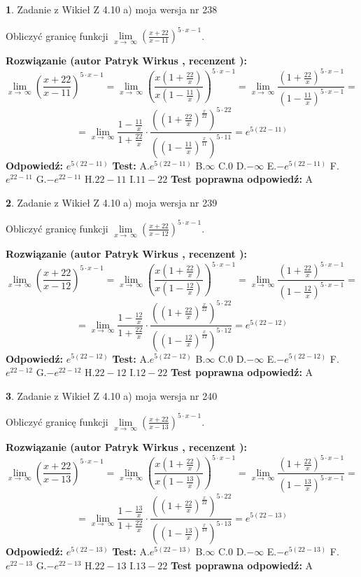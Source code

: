 \documentclass[12pt, a4paper]{article}
\theoremstyle{definition} %
\newtheorem{zad}{}
\newcommand{\zadStart}[1]{\begin{zad}#1\newline}
\newcommand{\zadStop}{\end{zad}}
\newcommand{\rozwStart}[2]{\noindent \textbf{Rozwiązanie (autor #1 , recenzent #2): }\newline}
\newcommand{\rozwStop}{\newline}
\newcommand{\odpStart}{\noindent \textbf{Odpowiedź:}\newline}
\newcommand{\odpStop}{\newline}
\newcommand{\testStart}{\noindent \textbf{Test:}\newline}
\newcommand{\testStop}{\newline}
\newcommand{\kluczStart}{\noindent \textbf{Test poprawna odpowiedź:}\newline}
\newcommand{\kluczStop}{\newline}
\begin{document}
\zadStart{Zadanie z Wikieł Z 4.10 a) moja wersja nr 238}


Obliczyć granicę funkcji  $\lim\limits_{x\to\ \infty}(\frac{x+22}{x-11})^{5\cdot x-1}$.
\zadStop
\rozwStart{Patryk Wirkus}{}
$$\lim\limits_{x\to\ \infty}(\frac{x+22}{x-11})^{5\cdot x-1} = \lim\limits_{x\to\ \infty}(\frac{x(1+\frac{22}{x})}{x(1-\frac{11}{x})})^{5\cdot x-1}=\lim\limits_{x\to\ \infty}\frac{(1+\frac{22}{x})^{5\cdot x-1}}{(1-\frac{11}{x})^{5\cdot x-1}}=$$
$$=\lim\limits_{x\to\ \infty}\frac{1-\frac{11}{x}}{1+\frac{22}{x}}\cdot\frac{((1+\frac{22}{x})^{\frac{x}{22}})^{5\cdot22}}{((1-\frac{11}{x})^{\frac{x}{11}})^{5\cdot11}}=e^{5(22-11)}$$
\rozwStop
\odpStart
$e^{5(22-11)}$
\odpStop
\testStart
A.$e^{5(22-11)}$ B.$\infty$ C.$0$ D.$-\infty$ E.$-e^{5(22-11)}$
F.$e^{22-11}$ G.$-e^{22-11}$
H.$22-11$
I.$11-22$
\testStop
\kluczStart
A
\kluczStop



\zadStart{Zadanie z Wikieł Z 4.10 a) moja wersja nr 239}


Obliczyć granicę funkcji  $\lim\limits_{x\to\ \infty}(\frac{x+22}{x-12})^{5\cdot x-1}$.
\zadStop
\rozwStart{Patryk Wirkus}{}
$$\lim\limits_{x\to\ \infty}(\frac{x+22}{x-12})^{5\cdot x-1} = \lim\limits_{x\to\ \infty}(\frac{x(1+\frac{22}{x})}{x(1-\frac{12}{x})})^{5\cdot x-1}=\lim\limits_{x\to\ \infty}\frac{(1+\frac{22}{x})^{5\cdot x-1}}{(1-\frac{12}{x})^{5\cdot x-1}}=$$
$$=\lim\limits_{x\to\ \infty}\frac{1-\frac{12}{x}}{1+\frac{22}{x}}\cdot\frac{((1+\frac{22}{x})^{\frac{x}{22}})^{5\cdot22}}{((1-\frac{12}{x})^{\frac{x}{12}})^{5\cdot12}}=e^{5(22-12)}$$
\rozwStop
\odpStart
$e^{5(22-12)}$
\odpStop
\testStart
A.$e^{5(22-12)}$ B.$\infty$ C.$0$ D.$-\infty$ E.$-e^{5(22-12)}$
F.$e^{22-12}$ G.$-e^{22-12}$
H.$22-12$
I.$12-22$
\testStop
\kluczStart
A
\kluczStop



\zadStart{Zadanie z Wikieł Z 4.10 a) moja wersja nr 240}


Obliczyć granicę funkcji  $\lim\limits_{x\to\ \infty}(\frac{x+22}{x-13})^{5\cdot x-1}$.
\zadStop
\rozwStart{Patryk Wirkus}{}
$$\lim\limits_{x\to\ \infty}(\frac{x+22}{x-13})^{5\cdot x-1} = \lim\limits_{x\to\ \infty}(\frac{x(1+\frac{22}{x})}{x(1-\frac{13}{x})})^{5\cdot x-1}=\lim\limits_{x\to\ \infty}\frac{(1+\frac{22}{x})^{5\cdot x-1}}{(1-\frac{13}{x})^{5\cdot x-1}}=$$
$$=\lim\limits_{x\to\ \infty}\frac{1-\frac{13}{x}}{1+\frac{22}{x}}\cdot\frac{((1+\frac{22}{x})^{\frac{x}{22}})^{5\cdot22}}{((1-\frac{13}{x})^{\frac{x}{13}})^{5\cdot13}}=e^{5(22-13)}$$
\rozwStop
\odpStart
$e^{5(22-13)}$
\odpStop
\testStart
A.$e^{5(22-13)}$ B.$\infty$ C.$0$ D.$-\infty$ E.$-e^{5(22-13)}$
F.$e^{22-13}$ G.$-e^{22-13}$
H.$22-13$
I.$13-22$
\testStop
\kluczStart
A
\kluczStop
\end{document}
